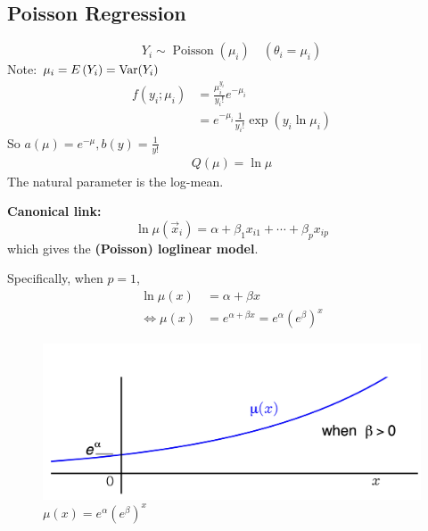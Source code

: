 \documentclass[11pt]{elegantbook}
\begin{document}
\subsection{Poisson Regression}
\begin{example}
    $$
    Y_i \sim \operatorname{Poisson}\left(\mu_i\right) \quad\left(\theta_i=\mu_i\right)
    $$
    Note: $\mu_i=E\left(Y_i\right)=\textnormal{Var}(Y_i)$
    $$
    \begin{aligned}
    f\left(y_i ; \mu_i\right) & =\frac{\mu_i^{y_i}}{y_{i} !} e^{-\mu_i} \\
    & =e^{-\mu_i} \frac{1}{y_{i} !} \exp \left(y_i \ln \mu_i\right)
    \end{aligned}
    $$
    So $a(\mu)=e^{-\mu}, b(y)=\frac{1}{y !}$
    $$
    \begin{gathered}
    Q(\mu)=\ln \mu
    \end{gathered}
    $$
    The natural parameter is the log-mean.

    \textbf{Canonical link:}
    $$
    \ln \mu(\vec{x}_i)=\alpha+\beta_1 x_{i1}+\cdots+\beta_p x_{ip}
    $$
    which gives the \textbf{(Poisson) loglinear model}.

    Specifically, when $p=1$,
    \begin{equation}
        \begin{aligned}
            \ln \mu(x)&=\alpha+\beta x\\
            \Leftrightarrow \mu(x)&=e^{\alpha+\beta x}=e^\alpha (e^\beta)^x
        \end{aligned}
        \nonumber
    \end{equation}
    \begin{center}\begin{figure}[htbp]
        \centering
        \includegraphics[scale=0.18]{logl.png}
        \caption{$\mu(x)=e^\alpha (e^\beta)^x$}
        \label{}
    \end{figure}\end{center}
\end{example}
\end{document}

